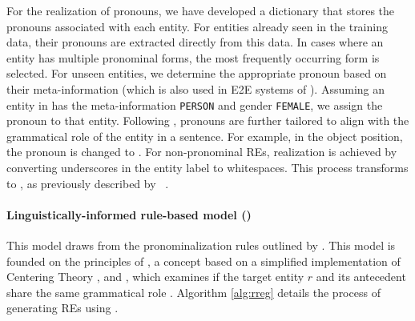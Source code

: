 For the realization of pronouns, we have developed a dictionary that stores the pronouns associated with each entity. For entities already seen in the training data, their pronouns are extracted directly from this data. In cases where an entity has multiple pronominal forms, the most frequently occurring form is selected. For unseen entities, we determine the appropriate pronoun based on their meta-information (which is also used in E2E systems of \citealt{cunha-etal-2020-referring}). Assuming an entity in \webnlg has the meta-information \texttt{PERSON} and gender \texttt{FEMALE}, we assign the pronoun  to that entity. Following \citet{castro-ferreira-etal-2016-towards-variation}, pronouns are further tailored to align with the grammatical role of the entity in a sentence. For example, in the object position, the pronoun  is changed to . For non-pronominal REs, realization is achieved by converting underscores in the entity label to whitespaces. This process transforms  to , as previously described by ~\citet{ferreira2018neuralreg}.








\paragraph*{Linguistically-informed rule-based model ()}

This model draws from the pronominalization rules outlined by \citet{henschel2000pronominalization}.  This model is founded on the principles of , a concept based on a simplified implementation of Centering Theory \citep{grosz1995centering}, and , which examines if the target entity $r$ and its antecedent share the same grammatical role \citep{henschel2000pronominalization}. Algorithm \ref{alg:rreg} details the process of generating REs using .

